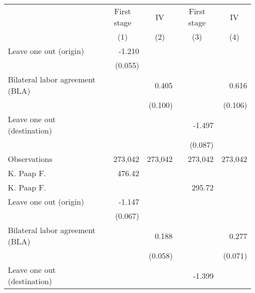 \begin{tabular}{l*{4}{r}} \toprule
                    &\multicolumn{1}{c}{First stage}&\multicolumn{1}{c}{IV}&\multicolumn{1}{c}{First stage}&\multicolumn{1}{c}{IV}\\\cmidrule(lr){2-2}\cmidrule(lr){3-3}\cmidrule(lr){4-4}\cmidrule(lr){5-5}
                    &\multicolumn{1}{c}{(1)}         &\multicolumn{1}{c}{(2)}         &\multicolumn{1}{c}{(3)}         &\multicolumn{1}{c}{(4)}         \\
\midrule
Leave one out (origin)&      -1.210\sym{***}&                     &                     &                     \\
                    &     (0.055)         &                     &                     &                     \\
\addlinespace
Bilateral labor agreement (BLA)&                     &       0.405\sym{***}&                     &       0.616\sym{***}\\
                    &                     &     (0.100)         &                     &     (0.106)         \\
\addlinespace
Leave one out (destination)&                     &                     &      -1.497\sym{***}&                     \\
                    &                     &                     &     (0.087)         &                     \\
\midrule
Observations        &     273,042         &     273,042         &     273,042         &     273,042         \\
K. Paap F.          &      476.42         &                     &                     &                     \\
K. Paap F.          &                     &                     &      295.72         &                     \\
\addlinespace
Leave one out (origin)&      -1.147\sym{***}&                     &                     &                     \\
                    &     (0.067)         &                     &                     &                     \\
\addlinespace
Bilateral labor agreement (BLA)&                     &       0.188\sym{***}&                     &       0.277\sym{***}\\
                    &                     &     (0.058)         &                     &     (0.071)         \\
\addlinespace
Leave one out (destination)&                     &                     &      -1.399\sym{***}&                     \\

\end{tabular}
